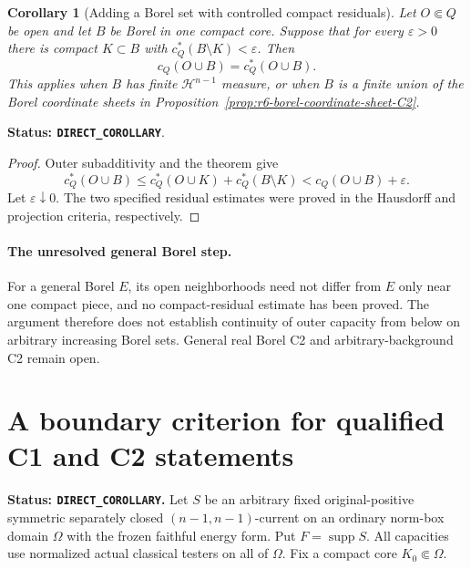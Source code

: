 \documentclass[11pt,a4paper]{article}
\numberwithin{equation}{section}
\newtheorem{corollary}[theorem]{Corollary}
\theoremstyle{definition}
\theoremstyle{remark}
\begin{document}
\begin{corollary}[Adding a Borel set with controlled compact residuals]
\label{cor:r6-convex-open-residual-C2}
Let $O\Subset Q$ be open and let $B$ be Borel in one compact core.
Suppose that for every $\varepsilon>0$ there is compact $K\subset B$
with $c_Q^*(B\setminus K)<\varepsilon$. Then
\[
                            c_Q(O\cup B)=c_Q^*(O\cup B).
\]
This applies when $B$ has finite $\mathcal H^{n-1}$ measure, or
when $B$ is a finite union of the Borel coordinate sheets in
Proposition~\ref{prop:r6-borel-coordinate-sheet-C2}.
\end{corollary}

\noindent\textbf{Status: \texttt{DIRECT\_COROLLARY}}.

\begin{proof}
Outer subadditivity and the theorem give
\[
 c_Q^*(O\cup B)\le c_Q^*(O\cup K)+c_Q^*(B\setminus K)
                 <c_Q(O\cup B)+\varepsilon.
\]
Let $\varepsilon\downarrow0$. The two specified residual estimates
were proved in the Hausdorff and projection criteria, respectively.
\end{proof}

\paragraph{The unresolved general Borel step.}
For a general Borel $E$, its open neighborhoods need not differ from
$E$ only near one compact piece, and no compact-residual estimate has
been proved. The argument therefore does not establish continuity of
outer capacity from below on arbitrary increasing Borel sets. General
real Borel C2 and arbitrary-background C2 remain open.



\section{A boundary criterion for qualified C1 and C2 statements}
\label{sec:r6-energy-boundary-criterion}

\noindent\textbf{Status: \texttt{DIRECT\_COROLLARY}.}
Let $S$ be an arbitrary fixed original-positive symmetric separately
closed $(n-1,n-1)$-current on an ordinary norm-box domain $\Omega$
with the frozen faithful energy form. Put $F=\operatorname{supp}S$.
All capacities use normalized actual classical testers on all of
$\Omega$. Fix a compact core $K_0\Subset\Omega$.
\end{document}
